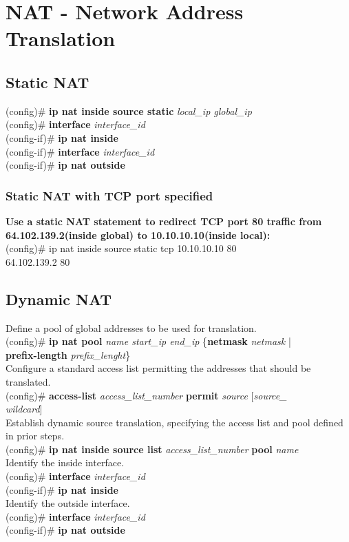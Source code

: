 \section{NAT - Network Address Translation}
\subsection{Static NAT}
(config)\# \textbf{ip nat inside source static} \textit{local\_ip global\_ip}\\
(config)\# \textbf{interface} \textit{interface\_id}\\
(config-if)\# \textbf{ip nat inside}\\
(config-if)\# \textbf{interface} \textit{interface\_id}\\
(config-if)\# \textbf{ip nat outside}
\subsubsection*{Static NAT with TCP port specified}
\textrm{\textbf{Use a static NAT statement to redirect TCP port 80 traffic from 64.102.139.2(inside global) to 10.10.10.10(inside local):}}\\
(config)\# ip nat inside source static tcp 10.10.10.10 80 \\64.102.139.2 80
\subsection{Dynamic NAT}
\textrm{Define a pool of global addresses to be used for translation.}\\
(config)\# \textbf{ip nat pool} \textit{name start\_ip end\_ip} \{\textbf{netmask} \textit{netmask} | \\\textbf{prefix-length} \textit{prefix\_lenght}\}\vspace{11pt}\\
\textrm{Configure a standard access list permitting the addresses that should be translated.}\\
(config)\# \textbf{access-list} \textit{access\_list\_number} \textbf{permit} \textit{source} [\textit{source\_\\wildcard}]\vspace{11pt}\\
\textrm{Establish dynamic source translation, specifying the access list and pool defined in prior steps.}\\
(config)\# \textbf{ip nat inside source list} \textit{access\_list\_number} \textbf{pool} \textit{name}\vspace{11pt}\\
\textrm{Identify the inside interface.}\\
(config)\# \textbf{interface} \textit{interface\_id}\\
(config-if)\# \textbf{ip nat inside}\vspace{11pt}\\
\textrm{Identify the outside interface.}\\
(config)\# \textbf{interface} \textit{interface\_id}\\
(config-if)\# \textbf{ip nat outside}
